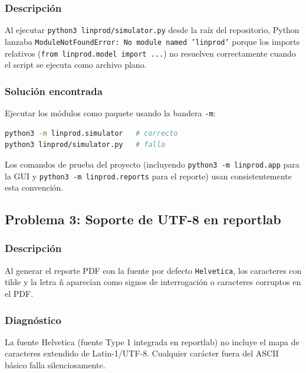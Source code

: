 \documentclass[12pt,letterpaper]{article}
\begin{document}
\subsubsection*{Descripción}

Al ejecutar \texttt{python3 linprod/simulator.py} desde la raíz del repositorio, Python
lanzaba \texttt{ModuleNotFoundError: No module named 'linprod'} porque los imports
relativos (\texttt{from linprod.model import ...}) no resuelven correctamente cuando el
script se ejecuta como archivo plano.

\subsubsection*{Solución encontrada}

Ejecutar los módulos como paquete usando la bandera \texttt{-m}:

\begin{lstlisting}[language=bash]
python3 -m linprod.simulator   # correcto
python3 linprod/simulator.py   # falla
\end{lstlisting}

Los comandos de prueba del proyecto (incluyendo \texttt{python3 -m linprod.app} para la
GUI y \texttt{python3 -m linprod.reports} para el reporte) usan consistentemente esta
convención.

\vspace{0.8em}
\subsection{Problema 3: Soporte de UTF-8 en reportlab}

\subsubsection*{Descripción}

Al generar el reporte PDF con la fuente por defecto \texttt{Helvetica}, los caracteres con
tilde y la letra ñ aparecían como signos de interrogación o caracteres corruptos en el PDF.

\subsubsection*{Diagnóstico}

La fuente Helvetica (fuente Type 1 integrada en reportlab) no incluye el mapa de caracteres
extendido de Latin-1/UTF-8. Cualquier carácter fuera del ASCII básico falla silenciosamente.
\end{document}
